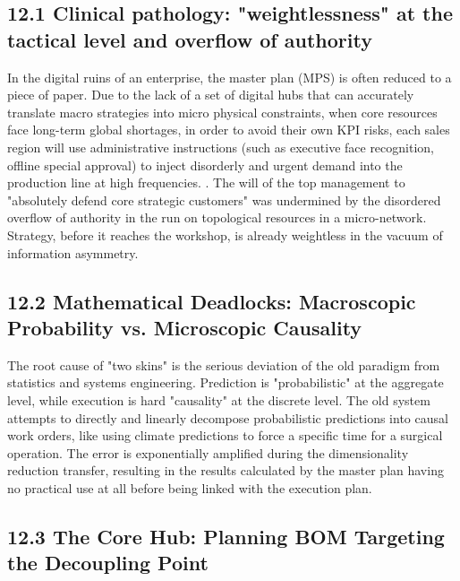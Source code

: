 \documentclass[11pt,a4paper]{article}
\begin{document}
\subsection*{12.1 Clinical pathology: "weightlessness" at the tactical level and overflow of authority}


In the digital ruins of an enterprise, the master plan (MPS) is often reduced to a piece of paper. Due to the lack of a set of digital hubs that can accurately translate macro strategies into micro physical constraints, when core resources face long-term global shortages, in order to avoid their own KPI risks, each sales region will use administrative instructions (such as executive face recognition, offline special approval) to inject disorderly and urgent demand into the production line at high frequencies. . The will of the top management to "absolutely defend core strategic customers" was undermined by the disordered overflow of authority in the run on topological resources in a micro-network. Strategy, before it reaches the workshop, is already weightless in the vacuum of information asymmetry.


\subsection*{12.2 Mathematical Deadlocks: Macroscopic Probability vs. Microscopic Causality}


The root cause of "two skins" is the serious deviation of the old paradigm from statistics and systems engineering. Prediction is "probabilistic" at the aggregate level, while execution is hard "causality" at the discrete level. The old system attempts to directly and linearly decompose probabilistic predictions into causal work orders, like using climate predictions to force a specific time for a surgical operation. The error is exponentially amplified during the dimensionality reduction transfer, resulting in the results calculated by the master plan having no practical use at all before being linked with the execution plan.


\subsection*{12.3 The Core Hub: Planning BOM Targeting the Decoupling Point}
\end{document}
